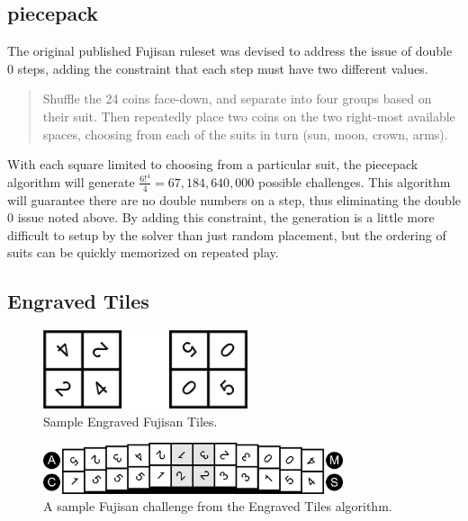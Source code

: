 \documentclass[10pt,journal,compsoc]{IEEEtran}
\begin{document}
\subsection{piecepack}

The original published Fujisan ruleset was devised to address the issue of double 0 steps, adding the constraint that each step must have two different values.

\begin{quote}
    
  Shuffle the 24 coins face-down, and separate into four groups based on their suit. Then repeatedly place two coins on the two right-most available spaces, choosing from each of the suits in turn (sun, moon, crown, arms).
\end{quote}


With each square limited to choosing from a particular suit, the piecepack algorithm will generate $\frac{6!^4}{4} = 67,184,640,000$ possible challenges. 
This algorithm will guarantee there are no double numbers on a step, thus eliminating the double 0 issue noted above. By adding this constraint, the generation is a little more difficult to setup by the solver than just random placement, but the ordering of suits can be quickly memorized on repeated play.

\subsection{Engraved Tiles}

\begin{figure}[t]
\centering
\includegraphics[width=6cm]{graphics/engravedsample.png}
\caption{Sample Engraved Fujisan Tiles.}
\label{fig:engravedsample}
\end{figure}

\begin{figure}[b]
\includegraphics[width=8.8cm]{graphics/fujisan-engraved.png}
\caption{A sample Fujisan challenge from the Engraved Tiles algorithm.}
\label{fig:tileexample}
\end{figure}
\end{document}
